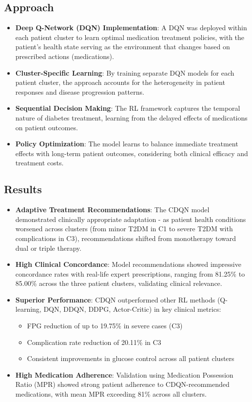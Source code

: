 \subsection*{Approach}
\begin{itemize}
    \item \textbf{Deep Q-Network (DQN) Implementation}: A DQN was deployed within each patient cluster to learn optimal medication treatment policies, with the patient's health state serving as the environment that changes based on prescribed actions (medications).
    \item \textbf{Cluster-Specific Learning}: By training separate DQN models for each patient cluster, the approach accounts for the heterogeneity in patient responses and disease progression patterns.
    \item \textbf{Sequential Decision Making}: The RL framework captures the temporal nature of diabetes treatment, learning from the delayed effects of medications on patient outcomes.
    \item \textbf{Policy Optimization}: The model learns to balance immediate treatment effects with long-term patient outcomes, considering both clinical efficacy and treatment costs.
\end{itemize}

\subsection*{Results}
\begin{itemize}
    \item \textbf{Adaptive Treatment Recommendations}: The CDQN model demonstrated clinically appropriate adaptation - as patient health conditions worsened across clusters (from minor T2DM in C1 to severe T2DM with complications in C3), recommendations shifted from monotherapy toward dual or triple therapy.
    \item \textbf{High Clinical Concordance}: Model recommendations showed impressive concordance rates with real-life expert prescriptions, ranging from 81.25\% to 85.00\% across the three patient clusters, validating clinical relevance.
    \item \textbf{Superior Performance}: CDQN outperformed other RL methods (Q-learning, DQN, DDQN, DDPG, Actor-Critic) in key clinical metrics:
    \begin{itemize}
        \item FPG reduction of up to 19.75\% in severe cases (C3)
        \item Complication rate reduction of 20.11\% in C3
        \item Consistent improvements in glucose control across all patient clusters
    \end{itemize}
    \item \textbf{High Medication Adherence}: Validation using Medication Possession Ratio (MPR) showed strong patient adherence to CDQN-recommended medications, with mean MPR exceeding 81\% across all clusters.
\end{itemize}

